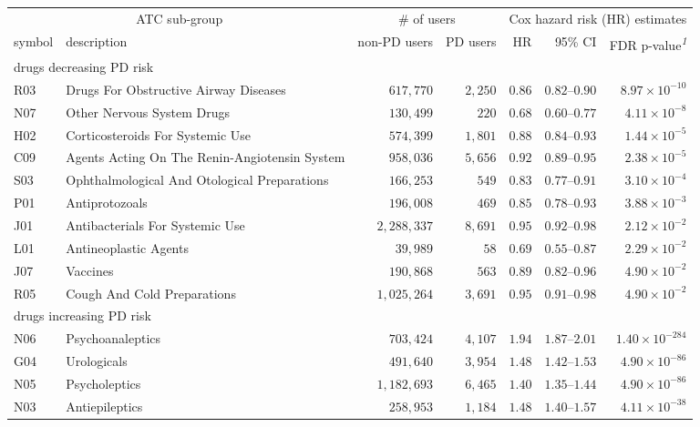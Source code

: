 \setlength{\LTpost}{0mm}
\begin{longtable}{llrrrrr}
\toprule
\multicolumn{2}{c}{ATC sub-group} & \multicolumn{2}{c}{\# of users} & \multicolumn{3}{c}{Cox hazard risk (HR) estimates} \\ 
\cmidrule(lr){1-2} \cmidrule(lr){3-4} \cmidrule(lr){5-7}
symbol & description & non-PD users & PD users & HR & 95\% CI & FDR p-value\textsuperscript{\textit{1}} \\ 
\midrule
\multicolumn{7}{l}{drugs decreasing PD risk} \\ 
\midrule
R03 & Drugs For Obstructive Airway Diseases & $617,770$ & $2,250$ & $0.86$ & $0.82$–$0.90$ & $8.97 \times 10^{-10}$ \\ 
N07 & Other Nervous System Drugs & $130,499$ & $220$ & $0.68$ & $0.60$–$0.77$ & $4.11 \times 10^{-8}$ \\ 
H02 & Corticosteroids For Systemic Use & $574,399$ & $1,801$ & $0.88$ & $0.84$–$0.93$ & $1.44 \times 10^{-5}$ \\ 
C09 & Agents Acting On The Renin-Angiotensin System & $958,036$ & $5,656$ & $0.92$ & $0.89$–$0.95$ & $2.38 \times 10^{-5}$ \\ 
S03 & Ophthalmological And Otological Preparations & $166,253$ & $549$ & $0.83$ & $0.77$–$0.91$ & $3.10 \times 10^{-4}$ \\ 
P01 & Antiprotozoals & $196,008$ & $469$ & $0.85$ & $0.78$–$0.93$ & $3.88 \times 10^{-3}$ \\ 
J01 & Antibacterials For Systemic Use & $2,288,337$ & $8,691$ & $0.95$ & $0.92$–$0.98$ & $2.12 \times 10^{-2}$ \\ 
L01 & Antineoplastic Agents & $39,989$ & $58$ & $0.69$ & $0.55$–$0.87$ & $2.29 \times 10^{-2}$ \\ 
J07 & Vaccines & $190,868$ & $563$ & $0.89$ & $0.82$–$0.96$ & $4.90 \times 10^{-2}$ \\ 
R05 & Cough And Cold Preparations & $1,025,264$ & $3,691$ & $0.95$ & $0.91$–$0.98$ & $4.90 \times 10^{-2}$ \\ 
\midrule
\multicolumn{7}{l}{drugs increasing PD risk} \\ 
\midrule
N06 & Psychoanaleptics & $703,424$ & $4,107$ & $1.94$ & $1.87$–$2.01$ & $1.40 \times 10^{-284}$ \\ 
G04 & Urologicals & $491,640$ & $3,954$ & $1.48$ & $1.42$–$1.53$ & $4.90 \times 10^{-86}$ \\ 
N05 & Psycholeptics & $1,182,693$ & $6,465$ & $1.40$ & $1.35$–$1.44$ & $4.90 \times 10^{-86}$ \\ 
N03 & Antiepileptics & $258,953$ & $1,184$ & $1.48$ & $1.40$–$1.57$ & $4.11 \times 10^{-38}$ \\ 

\end{longtable}
